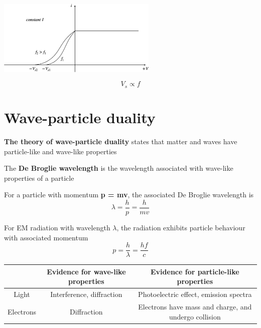 \documentclass[a4paper, 10pt]{article}
\begin{document}
\begin{minipage}{0.5\textwidth}
   \begin{center}
      \includegraphics[width=3in]{figures/6.pdf} 
   \end{center}	
\end{minipage}
\begin{minipage}{0.5\textwidth}
   \[
   V_s \propto f
   \]
   
\end{minipage}

\section{Wave-particle duality}

\begin{framed}
   \textbf{The theory of wave-particle duality} states that matter and waves have particle-like and wave-like properties

   The \textbf{De Broglie wavelength} is the wavelength associated with wave-like properties of a particle
\end{framed}	

\begin{framed}
   For a particle with momentum \textbf{p = mv}, the associated De Broglie wavelength is 
   \[
     \lambda = \frac{h}{p} = \frac{h}{mv}
   \]
   
   For EM radiation with wavelength $\lambda$, the radiation exhibits particle behaviour with associated momentum 
   \[
   p = \frac{h}{\lambda} = \frac{hf}{c}
   \]
   
\end{framed}	

\begin{center}
   \begin{tabular}{c | c | c}
      & Evidence for wave-like properties & Evidence for particle-like properties \\ \hline
      Light & Interference, diffraction & Photoelectric effect, emission spectra \\ \hline
      Electrons & Diffraction & Electrons have mass and charge, and undergo collision 
   \end{tabular}
\end{center}
\end{document}
